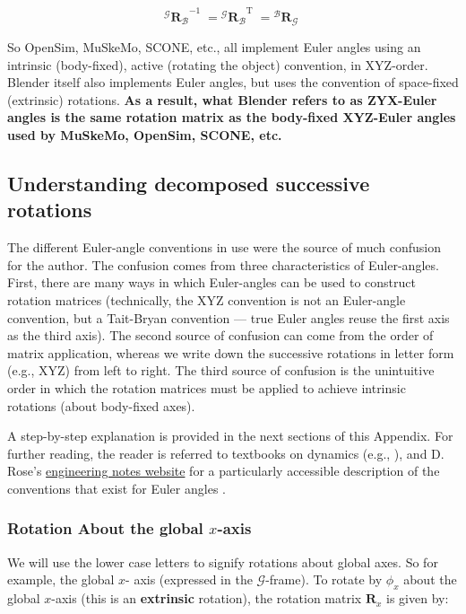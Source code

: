 \documentclass{article}
\begin{document}
\begin{equation}
    {{}^{\mathcal{G}} \mathbf{R}_{\mathcal{B}}}^{-1} \; = {{}^{\mathcal{G}} \mathbf{R}_{\mathcal{B}}}^\mathrm{T} \;  = {{}^{\mathcal{B}} \mathbf{R}_{\mathcal{G}}} \;   
    \label{sec:inversermatrix}    
\end{equation}


So OpenSim, MuSkeMo, SCONE, etc., all implement Euler angles using an intrinsic (body-fixed), active (rotating the object) convention, in XYZ-order. Blender itself also implements Euler angles, but uses the convention of space-fixed (extrinsic) rotations. \textbf{As a result, what Blender refers to as ZYX-Euler angles is the same rotation matrix as the body-fixed XYZ-Euler angles used by MuSkeMo, OpenSim, SCONE, etc.}

\subsection{Understanding decomposed successive rotations}

The different Euler-angle conventions in use were the source of much confusion for the author. The confusion comes from three characteristics of Euler-angles. First, there are many ways in which Euler-angles can be used to construct rotation matrices (technically, the XYZ convention is not an Euler-angle convention, but a Tait-Bryan convention --- true Euler angles reuse the first axis as the third axis). The second source of confusion can come from the order of matrix application, whereas we write down the successive rotations in letter form (e.g., XYZ) from left to right. The third source of confusion is the unintuitive order in which the rotation matrices must be applied to achieve intrinsic rotations (about body-fixed axes).

A step-by-step explanation is provided in the next sections of this Appendix. For further reading, the reader is referred to textbooks on dynamics (e.g., \cite{kaneSpacecraftDynamics1983, valleryAdvancedDynamics2019}), and D. Rose's \href{https://danceswithcode.net/engineeringnotes/rotations_in_3d/rotations_in_3d_part1.html}{engineering notes website} for a particularly accessible description of the conventions that exist for Euler angles \cite{roseRotationsThreeDimensionsEuler2015}.


\subsubsection*{Rotation About the global \( x \)-axis}
We will use the lower case letters to signify rotations about global axes. So for example, the global \( x \)- axis (expressed in the \(\mathcal{G} \)-frame).
To rotate by \( \phi_x \) about the global \( x \)-axis (this is an \textbf{extrinsic} rotation), the rotation matrix \( \mathbf{R}_x \) is given by:
\end{document}
